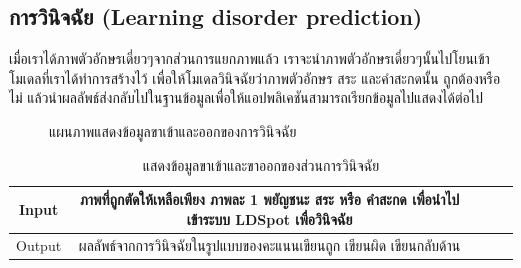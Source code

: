 \documentclass[12pt,oneside,openright,a4paper]{cpe-thai-project}
\begin{document}
  \subsection{การวินิจฉัย (Learning disorder prediction)}
  เมื่อเราได้ภาพตัวอักษรเดี่ยวๆจากส่วนการแยกภาพแล้ว เราจะนำภาพตัวอักษรเดี่ยวๆนั้นไปโยนเข้าโมเดลที่เราได้ทำการสร้างไว้ เพื่อให้โมเดลวินิจฉัยว่าภาพตัวอักษร สระ และคำสะกดนั้น ถูกต้องหรือไม่ 
   แล้วนำผลลัพธ์ส่งกลับไปในฐานข้อมูลเพื่อให้แอปพลิเคชันสามารถเรียกข้อมูลไปแสดงได้ต่อไป 
  \begin{figure}[!ht]\centering
    \setlength{\fboxrule}{0.2mm} %
    \setlength{\fboxsep}{1cm}
    \caption{แผนภาพแสดงข้อมูลขาเข้าและออกของการวินิจฉัย}\label{fig:system}
   \end{figure}
  \begin{table}[!h]\centering
    \caption{แสดงข้อมูลขาเข้าและขาออกของส่วนการวินิจฉัย}\label{tbl:application1}
    \begin{tabular}{c|c|l|rr} \hline
    Input & ภาพที่ถูกตัดให้เหลือเพียง ภาพละ 1 พยัญชนะ สระ หรือ คำสะกด เพื่อนำไปเข้าระบบ LDSpot เพื่อวินิจฉัย  \\ \hline
    Output & ผลลัพธ์จากการวินิจฉัยในรูปแบบของคะแนนเขียนถูก เขียนผิด เขียนกลับด้าน \\ \hline
    \end{tabular}
    \end{table}
\newpage
\end{document}
